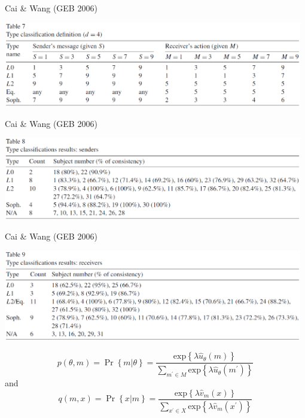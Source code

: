 \documentclass{beamer}
\begin{document}
\begin{frame}{Cai \& Wang (GEB 2006)}
\begin{card}
\begin{center}\includegraphics[width=0.98\textwidth]{./i/cw2006Tbl7.eps}\end{center}
\end{card}
\end{frame}
\begin{frame}{Cai \& Wang (GEB 2006)}
\begin{card}
\begin{center}\includegraphics[width=0.98\textwidth]{./i/cw2006Tbl8.eps}\end{center}
\end{card}
\end{frame}
\begin{frame}{Cai \& Wang (GEB 2006)}
\begin{card}
\begin{center}\includegraphics[width=0.98\textwidth]{./i/cw2006Tbl9.eps}\end{center}
\end{card}
\end{frame}
\begin{frame}
\begin{card}
			$$p(\theta,m)=\Pr\left\{m\left| \theta\right. \right\}= \frac{\text{exp}\left\{\lambda \hat{u}_\theta(m)\right\}}{\sum_{m^\prime\in M} \text{exp}\left\{\lambda \hat{u}_{\theta}(m^\prime)\right\}}$$
			and
			$$q(m,x)=
			\Pr\left\{x\left| m\right. \right\}= 
			\frac{\text{exp}\left\{\lambda \hat{v}_m(x)\right\} }{\sum_{x^\prime\in X} \text{exp}\left\{\lambda \hat{v}_{m}(x^\prime)\right\}  }$$
\end{card}
\end{frame}
\end{document}
